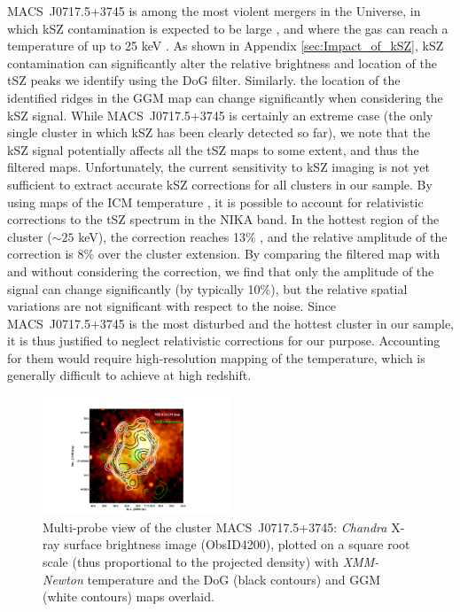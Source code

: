 \documentclass[traditabstract]{aa}
\begin{document}
\mbox{MACS~J0717.5+3745} is among the most violent mergers in the Universe, in which kSZ contamination is expected to be large \citep{Mroczkowski2012,Sayers2013,Adam2016b}, and where the gas can reach a temperature of up to 25 keV \citep[e.g.,][]{Adam2017}. As shown in Appendix \ref{sec:Impact_of_kSZ}, kSZ contamination can significantly alter the relative brightness and location of the tSZ peaks we identify using the DoG filter. Similarly. the location of the identified ridges in the GGM map can change significantly when considering the kSZ signal. While \mbox{MACS~J0717.5+3745} is certainly an extreme case (the only single cluster in which kSZ has been clearly detected so far), we note that the kSZ signal potentially affects all the tSZ maps to some extent, and thus the filtered maps. Unfortunately, the current sensitivity to kSZ imaging is not yet sufficient to extract accurate kSZ corrections for all clusters in our sample. By using maps of the ICM temperature \citep[e.g.,][]{Adam2017}, it is possible to account for relativistic corrections to the tSZ spectrum in the NIKA band. In the hottest region of the cluster ($\sim 25$ keV), the correction reaches 13\% \citep[see also Table 1 in][]{Adam2016b}, and the relative amplitude of the correction is 8\% over the cluster extension. By comparing the filtered map with and without considering the correction, we find that only the amplitude of the signal can change significantly (by typically 10\%), but the relative spatial variations are not significant with respect to the noise. Since \mbox{MACS~J0717.5+3745} is the most disturbed and the hottest cluster in our sample, it is thus justified to neglect relativistic corrections for our purpose. Accounting for them would require high-resolution mapping of the temperature, which is generally difficult to achieve at high redshift.

\begin{figure}[h]
\center
\includegraphics[trim=5cm 0cm 8cm 2cm, clip=true, width=0.5\textwidth]{Figure/MACSJ0717_multiL.pdf} 
\caption{\footnotesize{Multi-probe view of the cluster \mbox{MACS~J0717.5+3745}: \textit{Chandra} X-ray surface brightness image (ObsID4200), plotted on a square root scale (thus proportional to the projected density) with \textit{XMM-Newton} temperature \citep[green contours from][]{Adam2017} and the DoG (black contours) and GGM (white contours) maps overlaid.}}
\label{fig:MACSJ0717_multiL}
\end{figure}
\end{document}
